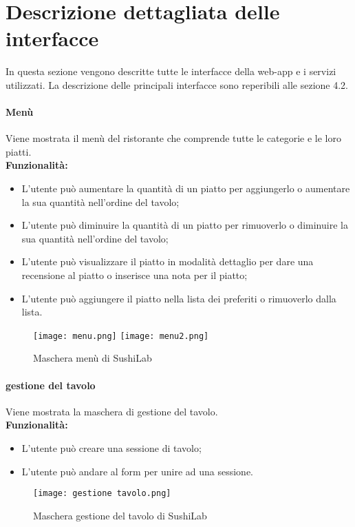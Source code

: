 \label{cap:appendice c}
\chapter{Descrizione dettagliata delle interfacce}
In questa sezione vengono descritte tutte le interfacce della web-app e i servizi utilizzati. La descrizione delle principali interfacce sono reperibili alle sezione 4.2.
\subsubsection{Menù}
Viene mostrata il menù del ristorante che comprende tutte le categorie e le loro piatti.\\
\textbf{Funzionalità:}
\begin{itemize}
    \item L'utente può aumentare la quantità di un piatto per aggiungerlo o aumentare la sua quantità nell'ordine del tavolo;
    \item L'utente può diminuire la quantità di un piatto per rimuoverlo o diminuire la sua quantità nell'ordine del tavolo;
    \item L'utente può visualizzare il piatto in modalità dettaglio per dare una recensione al piatto o inserisce una nota per il piatto;
    \item L'utente può aggiungere il piatto nella lista dei preferiti o rimuoverlo dalla lista.
\end{itemize}
\begin{figure}[H]
    \centering
    \texttt{[image: menu.png]}
    \texttt{[image: menu2.png]}
    \caption{Maschera menù di SushiLab}
\end{figure}


\subsubsection{gestione del tavolo}
Viene mostrata la maschera di gestione del tavolo.\\
\textbf{Funzionalità:}
\begin{itemize}
    \item L'utente può creare una sessione di tavolo;
    \item L'utente può andare al form per unire ad una sessione.
\end{itemize}
\begin{figure}[H]
    \centering
    \texttt{[image: gestione tavolo.png]}
    \caption{Maschera gestione del tavolo di SushiLab}
\end{figure}


